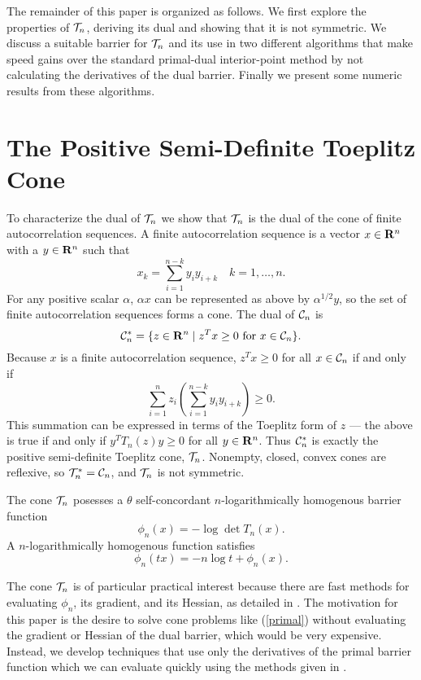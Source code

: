 \documentclass{article}
\begin{document}
The remainder of this paper is organized as follows. We first explore the properties of 
$\mathcal{T}_n$, deriving its dual and showing that it is not symmetric.  We discuss a suitable 
barrier for $\mathcal{T}_n$ and its use in two different algorithms that make speed gains 
over the standard primal-dual interior-point method by not calculating the derivatives
of the dual barrier. Finally we present some numeric results from these algorithms. 

\section{The Positive Semi-Definite Toeplitz Cone}

To characterize the dual of $\mathcal{T}_n$ we show that $\mathcal{T}_n$ is the dual of the 
cone of finite autocorrelation sequences. A finite autocorrelation sequence is a vector
$x \in \mathbf{R}^n$ with a $y \in \mathbf{R}^n$ such that 
\[
  x_k = \sum_{i=1}^{n-k} y_iy_{i+k} \quad k=1,\ldots,n.
\] 
For any positive scalar $\alpha$, $\alpha x$ can be represented as above 
by $\alpha^{1/2}y$, so the set of finite autocorrelation sequences forms a cone.
The dual of $\mathcal{C}_n$ is 
\[
  \mathcal{C}^*_n = \{z \in \mathbf{R}^n \mid z^Tx \geq 0 \text{ for } x \in \mathcal{C}_n\}.
\]
Because $x$ is a finite autocorrelation sequence, $z^Tx \geq 0$ for all $x \in \mathcal{C}_n$
if and only if
\[
  \sum_{i=1}^n z_i \left(\sum_{i=1}^{n-k} y_iy_{i+k}\right) \geq 0.
\]
This summation can be expressed in terms of the Toeplitz form of $z$ ---
the above is true if and only if $y^TT_n(z)y \geq 0$ for all $y \in \mathbf{R}^n$. Thus
$\mathcal{C}^*_n$ is exactly the positive semi-definite Toeplitz cone, $\mathcal{T}_n$. Nonempty,
closed, convex cones are reflexive, so $\mathcal{T}_n^* = \mathcal{C}_n$, and $\mathcal{T}_n$ is not
symmetric.

The cone $\mathcal{T}_n$ posesses a $\theta$ self-concordant $n$-logarithmically homogenous barrier function
\[
\phi_n(x) = - \log \det T_n(x).
\]
A $n$-logarithmically homogenous function satisfies
\[
 \phi_n(tx) = -n \log t + \phi_n(x).
\]

The cone $\mathcal{T}_n$ is of particular practical interest because there are fast methods for evaluating
$\phi_n$, its gradient, and its Hessian, as detailed in \cite{alkire2002convex}. The motivation for this
paper is the desire to solve cone problems like (\ref{primal}) without evaluating the
gradient or Hessian of the dual barrier, which would be very expensive. Instead, we develop
techniques that use only the derivatives of the primal barrier function which we can evaluate
quickly using the methods given in \cite{alkire2002convex}.
\end{document}
